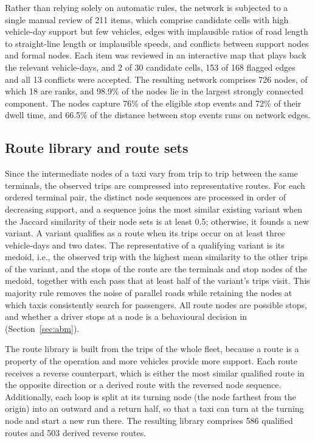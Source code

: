 Rather than relying solely on automatic rules, the network is subjected to a single manual review of 211 items, which comprise candidate cells with high vehicle-day support but few vehicles, edges with implausible ratios of road length to straight-line length or implausible speeds, and conflicts between support nodes and formal nodes. Each item was reviewed in an interactive map that plays back the relevant vehicle-days, and 2 of 30 candidate cells, 153 of 168 flagged edges and all 13 conflicts were accepted. The resulting network comprises 726 nodes, of which 18 are ranks, and 98.9\% of the nodes lie in the largest strongly connected component. The nodes capture 76\% of the eligible stop events and 72\% of their dwell time, and 66.5\% of the distance between stop events runs on network edges.

\subsection{Route library and route sets}

Since the intermediate nodes of a taxi vary from trip to trip between the same terminals, the observed trips are compressed into representative routes. For each ordered terminal pair, the distinct node sequences are processed in order of decreasing support, and a sequence joins the most similar existing variant when the Jaccard similarity of their node sets is at least 0.5; otherwise, it founds a new variant. A variant qualifies as a route when its trips occur on at least three vehicle-days and two dates. The representative of a qualifying variant is its medoid, i.e., the observed trip with the highest mean similarity to the other trips of the variant, and the stops of the route are the terminals and stop nodes of the medoid, together with each pass that at least half of the variant's trips visit. This majority rule removes the noise of parallel roads while retaining the nodes at which taxis consistently search for passengers. All route nodes are possible stops, and whether a driver stops at a node is a behavioural decision in \MA{} (Section~\ref{sec:abm}).

The route library is built from the trips of the whole fleet, because a route is a property of the operation and more vehicles provide more support. Each route receives a reverse counterpart, which is either the most similar qualified route in the opposite direction or a derived route with the reversed node sequence. Additionally, each loop is split at its turning node (the node farthest from the origin) into an outward and a return half, so that a taxi can turn at the turning node and start a new run there. The resulting library comprises 586 qualified routes and 503 derived reverse routes.

